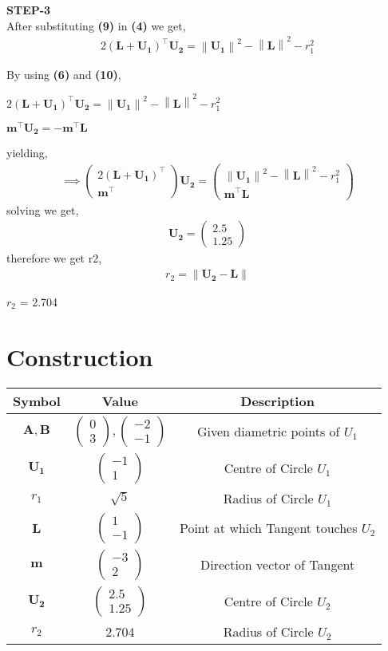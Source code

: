 \documentclass[journal,10pt,twocolumn]{article}
\providecommand{\norm}[1]{\left\lVert#1\right\rVert}
\providecommand{\brak}[1]{\ensuremath{\left(#1\right)}}
\newcommand{\myvec}[1]{\ensuremath{\begin{pmatrix}#1\end{pmatrix}}}
\let\vec\mathbf
\begin{document}
\textbf{STEP-3}\vspace{2mm}\\   
After substituting \textbf{(9)} in \textbf{(4)} we get,
\begin{align}
2\brak{\vec{L}+\vec{U_1}}^{\top}\vec{U_2} = \norm{\vec{U_1}}^2 - \norm{\vec{L}}^2 - r_1^2
\end{align}

By using \textbf{(6)} and \textbf{(10)},

\begin{center}
$ 2\brak{\vec{L}+\vec{U_1}}^{\top}\vec{U_2} = \norm{\vec{U_1}}^2 - \norm{\vec{L}}^2 - r_1^2 $ \\
\end{center}

\begin{center}
$ \vec{m}^{\top}\vec{U_2} = - \vec{m}^{\top}\vec{L} $ \\
\end{center}
 
yielding, 
\begin{align}
\implies \myvec{2\brak{\vec{L}+\vec{U_1}}^{\top} \\ \vec{m}^{\top}}\vec{U_2} = \myvec{\norm{\vec{U_1}}^2 - \norm{\vec{L}}^2 - r_1^2 \\ \vec{m}^{\top}\vec{L}} 
\end{align}
solving we get, 
\begin{align}
\vec{U_2} = \myvec{2.5 \\ 1.25}
\end{align}
therefore we get r2,
\begin{align}
r_2 = \norm{\vec{U_2} - \vec{L}}
\end{align}
\begin{center}
    $r_2$ = 2.704
\end{center}

\section*{\large Construction}
{
\setlength\extrarowheight{5pt}
\begin{tabular}{|c|c|c|}
	\hline
	\textbf{Symbol}&\textbf{Value}&\textbf{Description}\\
	\hline
	$\vec{A,B}$&$\myvec{0 \\ 3},\myvec{-2 \\ -1}$&Given diametric points of $U_1$\\
	\hline
	$\vec{U_1}$&$\myvec{-1 \\ 1}$&Centre of Circle $U_1$\\
	\hline
	$r_1$ & $\sqrt{5}$ & Radius of Circle $U_1$\\
	\hline
	$\vec{L}$&$\myvec{1 \\ -1}$&Point at which Tangent touches $U_2$\\
	\hline
	$\vec{m}$&$\myvec{-3 \\ 2}$&Direction vector of Tangent\\
	\hline
	$\vec{U_2}$&$\myvec{2.5 \\ 1.25}$&Centre of Circle $U_2$\\	
	\hline
	$r_2$ & 2.704 & Radius of Circle $U_2$\\
	\hline
\end{tabular}
}
\end{document}
